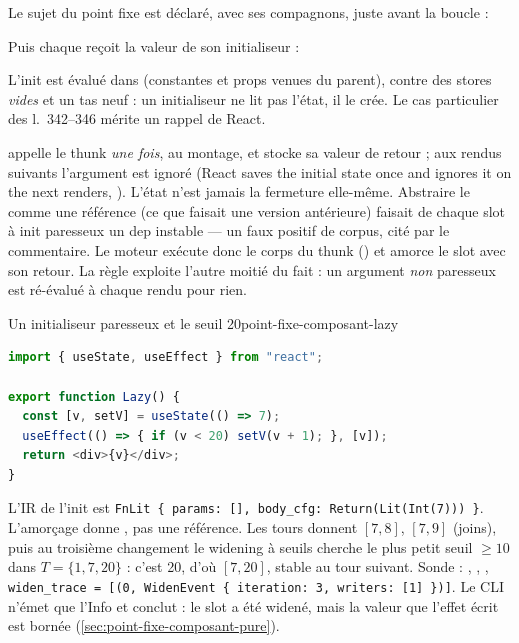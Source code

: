 Le sujet du point fixe est déclaré, avec ses compagnons, juste avant la
boucle :


Puis chaque  reçoit la valeur de son initialiseur :


L'init est évalué dans  (constantes et props venues du
parent), contre des stores \emph{vides} et un tas neuf : un initialiseur ne
lit pas l'état, il le crée. Le cas particulier des l.~342--346 mérite un
rappel de React.

\begin{react}
 appelle le thunk \emph{une fois}, au montage, et
stocke sa valeur de retour ; aux rendus suivants l'argument est ignoré
(\og React saves the initial state once and ignores it on the next
renders\fg, \cite{ReactDocs}). L'état n'est jamais la fermeture elle-même.
Abstraire le  comme une référence (ce que faisait une version
antérieure) faisait de chaque slot à init paresseux un \og dep instable\fg{}
--- un faux positif de corpus, cité par le commentaire. Le moteur exécute
donc le corps du thunk () et amorce le slot avec son retour.
La règle  exploite l'autre moitié du fait : un argument
\emph{non} paresseux est ré-évalué à chaque rendu pour rien.
\end{react}

\begin{exemple}{Un initialiseur paresseux et le seuil 20}{point-fixe-composant-lazy}
\begin{lstlisting}[language=TypeScript,caption={\file{/tmp/ch13/lazy.tsx}},label={lst:point-fixe-composant-lazy}]
import { useState, useEffect } from "react";

export function Lazy() {
  const [v, setV] = useState(() => 7);
  useEffect(() => { if (v < 20) setV(v + 1); }, [v]);
  return <div>{v}</div>;
}
\end{lstlisting}
L'IR de l'init est \texttt{FnLit \{ params: [], body\_cfg: Return(Lit(Int(7))) \}}.
L'amorçage donne , pas une référence. Les tours donnent
$[7,8]$, $[7,9]$ (joins), puis au troisième changement le widening à seuils
cherche le plus petit seuil $\geq 10$ dans $T = \{1, 7, 20\}$ : c'est 20, d'où
$[7,20]$, stable au tour suivant. Sonde : ,
, ,
\texttt{widen\_trace = [(0, WidenEvent \{ iteration: 3, writers: [1] \})]}. Le
CLI n'émet que l'Info  et conclut
 : le slot a été widené, mais la valeur
que l'effet écrit est bornée (\cref{sec:point-fixe-composant-pure}).
\end{exemple}

